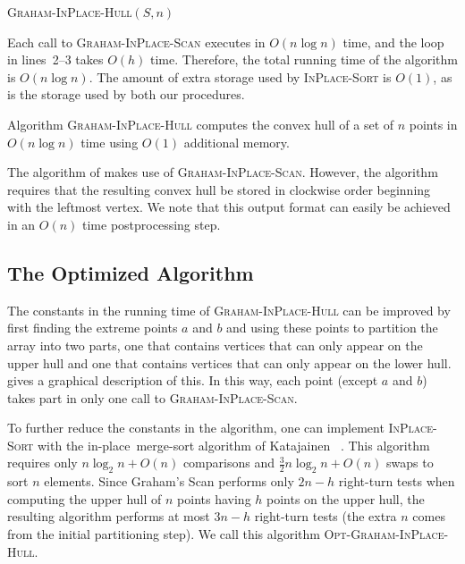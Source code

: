 \documentclass{elsart}
\newcommand{\inplace}{in-place}
\begin{document}
\vspace{1ex}
\noindent\begin{minipage}{\textwidth}
\textsc{Graham-InPlace-Hull}$(S, n)$
\begin{algorithmic}[1]
\ENDFOR
{}
\end{algorithmic}
\end{minipage}
\vspace{1ex}

Each call to \textsc{Graham-InPlace-Scan} executes in $O(n\log n)$
time, and the loop in lines~2--3 takes $O(h)$ time.  Therefore, the
total running time of the algorithm is $O(n\log n)$.  The amount of
extra storage used by \textsc{InPlace-Sort} is $O(1)$, as is the storage
used by both our procedures.

\begin{thm}
Algorithm \textsc{Graham-InPlace-Hull} computes the convex hull of a
set of $n$ points in $O(n\log n)$ time using $O(1)$ additional memory.
\end{thm}

The algorithm of  makes use of
\textsc{Graham-InPlace-Scan}. However, the algorithm requires that the
resulting convex hull be stored in clockwise order beginning with the
leftmost vertex.  We note that this output format can easily be
achieved in an $O(n)$ time postprocessing step.


\subsection{The Optimized Algorithm}

The constants in the running time of \textsc{Graham-InPlace-Hull} can
be improved by first finding the extreme points $a$ and $b$ and using
these points to partition the array into two parts, one that contains
vertices that can only appear on the upper hull and one that contains
vertices that can only appear on the lower hull.  
gives a graphical description of this.  In this way, each point
(except $a$ and $b$) takes part in only one call to
\textsc{Graham-InPlace-Scan}.

To further reduce the constants in the algorithm, one can implement
\textsc{InPlace-Sort} with the \inplace\ merge-sort algorithm of
Katajainen \etal\ \cite{kpt96}.  This algorithm requires only $n\log_2
n+O(n)$ comparisons and $\frac{3}{2}n\log_2 n+O(n)$ swaps to sort $n$
elements.  Since Graham's Scan performs only $2n-h$ right-turn tests
when computing the upper hull of $n$ points having $h$ points on the
upper hull, the resulting algorithm performs at most $3n-h$ right-turn
tests (the extra $n$ comes from the initial partitioning step).  We
call this algorithm \textsc{Opt-Graham-InPlace-Hull}.
\end{document}
